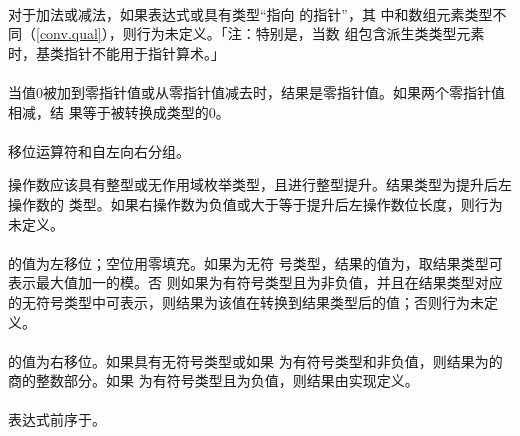 \paragraph{}
对于加法或减法，如果表达式或具有类型``指向 的指针''，其
中和数组元素类型不同（\ref{conv.qual}），则行为未定义。「注：特别是，当数
组包含派生类类型元素时，基类指针不能用于指针算术。」

\paragraph{}
当值0被加到零指针值或从零指针值减去时，结果是零指针值。如果两个零指针值相减，结
果等于被转换成类型的0。

\paragraph{}
移位运算符\tm{\tl{}\tl}和\tm{\tg{}\tg}自左向右分组。


操作数应该具有整型或无作用域枚举类型，且进行整型提升。结果类型为提升后左操作数的
类型。如果右操作数为负值或大于等于提升后左操作数位长度，则行为未定义。

\paragraph{}
的值为左移位；空位用零填充。如果为无符
号类型，结果的值为，取结果类型可表示最大值加一的模。否
则如果为有符号类型且为非负值，并且在结果类型对应
的无符号类型中可表示，则结果为该值在转换到结果类型后的值；否则行为未定义。

\paragraph{}
的值为右移位。如果具有无符号类型或如果
为有符号类型和非负值，则结果为的商的整数部分。如果
为有符号类型且为负值，则结果由实现定义。

\paragraph{}
表达式前序于。


